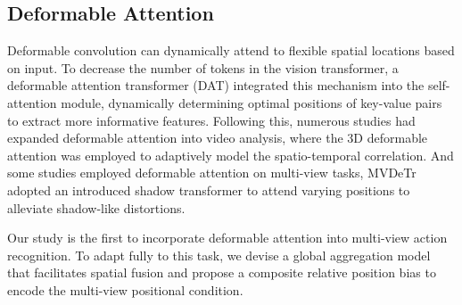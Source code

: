 \subsection{Deformable Attention}
Deformable convolution \cite{zhu2019deformable} can dynamically attend to flexible spatial locations based on input.
To decrease the number of tokens in the vision transformer, a deformable attention transformer (DAT) \cite{Xia2022VisionTW} integrated this mechanism into the self-attention module, dynamically determining optimal positions of key-value pairs to extract more informative features. 
Following this, numerous studies had expanded deformable attention into video analysis, where the 3D deformable attention \cite{Kim2022CrossModalLW} was employed to adaptively model the spatio-temporal correlation. 
And some studies employed deformable attention on multi-view tasks,
MVDeTr \cite{hou2021multiview} adopted an introduced shadow transformer to attend varying positions to alleviate shadow-like distortions.

Our study is the first to incorporate deformable attention into multi-view action recognition. To adapt fully to this task, we devise a global aggregation model that facilitates spatial fusion and propose a composite relative position bias to encode the multi-view positional condition.


